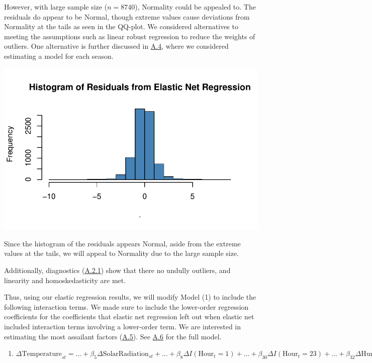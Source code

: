 \documentclass[
  letterpaper,
  DIV=11,
  numbers=noendperiod]{scrartcl}
\providecommand{\tightlist}{%
  \setlength{\itemsep}{0pt}\setlength{\parskip}{0pt}}\usepackage{longtable,booktabs,array}
\begin{document}
However, with large sample size (\(n=8740\)), Normality could be
appealed to. The residuals do appear to be Normal, though extreme values
cause deviations from Normality at the tails as seen in the QQ-plot. We
considered alternatives to meeting the assumptions such as linear robust
regression to reduce the weights of outliers. One alternative is further
discussed in \protect\hyperlink{a4}{A.4}, where we considered estimating
a model for each season.

\includegraphics{seoul_files/figure-pdf/unnamed-chunk-6-1.pdf}

Since the histogram of the residuals appears Normal, aside from the
extreme values at the tails, we will appeal to Normality due to the
large sample size.

Additionally, diagnostics (\protect\hyperlink{a21}{A.2.1}) show that
there no undully outliers, and linearity and homoskedasticity are met.

Thus, using our elastic regression results, we will modify Model (1) to
include the following interaction terms. We made sure to include the
lower-order regression coefficients for the coefficients that elastic
net regression left out when elastic net included interaction terms
involving a lower-order term. We are interested in estimating the most
assailant factors (\protect\hyperlink{a5}{A.5}). See
\protect\hyperlink{a6}{A.6} for the full model.

\begin{enumerate}
\def\labelenumi{(\arabic{enumi})}
\setcounter{enumi}{1}
\tightlist
\item
  \(\Delta\text{Temperature}_{st} = ... + \beta_5\Delta\text{SolarRadiation}_{st} + ... + \beta_8\Delta I(\text{Hour}_{t} = 1) + ... + \beta_{30}\Delta I(\text{Hour}_{t} = 23) + ... + \beta_{32}\Delta\text{Humidity}_{st}\text{SolarRadiation}_{st} + ... + \beta_{39}\Delta\text{SolarRadiation}_{st}\text{Rainfall}_{st} + ... + \sum_{n=1}^{23}{\beta_{131+n}\Delta\text{SolarRadiation}_{st}\Delta I(\text{Hour}_t=n)} + ... + \Delta\eta_{st}\)
\end{enumerate}
\end{document}
